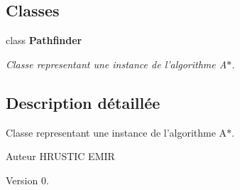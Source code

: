 \subsection*{Classes}
\begin{DoxyCompactItemize}
\item 
class {\bf Pathfinder}
\begin{DoxyCompactList}\small\item\em Classe representant une instance de l'algorithme A$\ast$. \end{DoxyCompactList}\end{DoxyCompactItemize}


\subsection{Description détaillée}
Classe representant une instance de l'algorithme A$\ast$. \begin{DoxyAuthor}{Auteur}
H\-R\-U\-S\-T\-I\-C E\-M\-I\-R 
\end{DoxyAuthor}
\begin{DoxyVersion}{Version}
0. 
\end{DoxyVersion}
